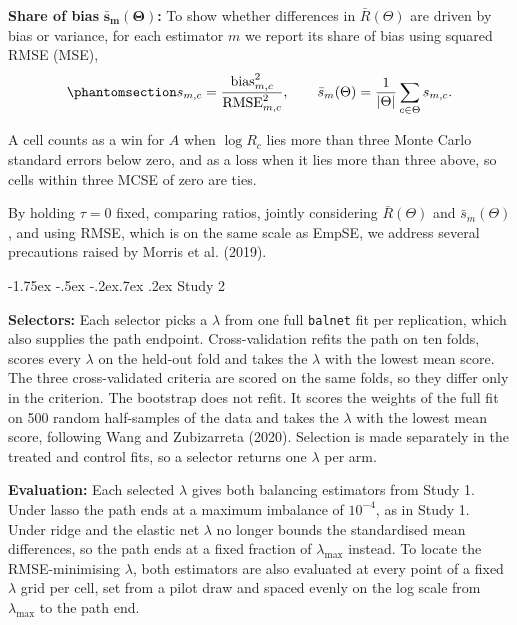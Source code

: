 \documentclass[
  12pt,
  a4paper,
]{article}
\makeatletter
\renewcommand\subsubsection{\@startsection{subsubsection}{3}{\z@}%
  {-1.75ex \@plus -.5ex \@minus -.2ex}{.7ex \@plus .2ex}%
  {\normalfont\normalsize\bfseries}}
\makeatother
\begin{document}
\textbf{Share of bias} \(\boldsymbol{\bar s_m(\Theta)}\)\textbf{:} To
show whether differences in \(\bar R(\Theta)\) are driven by bias or
variance, for each estimator \(m\) we report its share of bias using
squared RMSE (MSE),
\begin{equation}\protect\phantomsection\label{eq-sbar}{s_{m,c} = \frac{\mathrm{bias}_{m,c}^2}{\mathrm{RMSE}_{m,c}^2}, \qquad \bar s_m(\Theta) = \frac{1}{|\Theta|}\sum_{c \in \Theta} s_{m,c}.}\end{equation}

A cell counts as a win for \(A\) when \(\log R_c\) lies more than three
Monte Carlo standard errors below zero, and as a loss when it lies more
than three above, so cells within three MCSE of zero are ties.

By holding \(\tau = 0\) fixed, comparing ratios, jointly considering
\(\bar R(\Theta)\) and \(\bar s_m(\Theta)\), and using RMSE, which is on
the same scale as EmpSE, we address several precautions raised by Morris
et al. (2019).

\subsubsection{Study 2}\label{study-2-2}

\textbf{Selectors:} Each selector picks a \(\lambda\) from one full
\texttt{balnet} fit per replication, which also supplies the path
endpoint. Cross-validation refits the path on ten folds, scores every
\(\lambda\) on the held-out fold and takes the \(\lambda\) with the
lowest mean score. The three cross-validated criteria are scored on the
same folds, so they differ only in the criterion. The bootstrap does not
refit. It scores the weights of the full fit on 500 random half-samples
of the data and takes the \(\lambda\) with the lowest mean score,
following Wang and Zubizarreta (2020). Selection is made separately in
the treated and control fits, so a selector returns one \(\lambda\) per
arm.

\textbf{Evaluation:} Each selected \(\lambda\) gives both balancing
estimators from Study 1. Under lasso the path ends at a maximum
imbalance of \(10^{-4}\), as in Study 1. Under ridge and the elastic net
\(\lambda\) no longer bounds the standardised mean differences, so the
path ends at a fixed fraction of \(\lambda_{\max}\) instead. To locate
the RMSE-minimising \(\lambda\), both estimators are also evaluated at
every point of a fixed \(\lambda\) grid per cell, set from a pilot draw
and spaced evenly on the log scale from \(\lambda_{\max}\) to the path
end.
\end{document}

